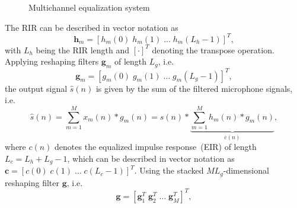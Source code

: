 \documentclass{article}
\begin{document}
\begin{figure}[b]
  \caption{Multichannel equalization system}
  \label{fig: acsys}
\end{figure}
The RIR can be described in vector notation as 
\begin{equation}
\mathbf{h}_m = [h_m(0) \; h_m(1) \; \ldots \; h_m(L_h-1)]^T,
\end{equation} 
with $L_h$ being the RIR length and $[\cdot]^T$ denoting the transpose operation.
Applying reshaping filters $\mathbf{g}_m$ of length $L_g$, i.e. 
\begin{equation}
\mathbf{g}_m = [g_m(0) \; g_m(1) \; \ldots \; g_m(L_g-1)]^T,
\end{equation}
the output signal $\hat{s}(n)$ is given by the sum of the filtered microphone signals, i.e.
\begin{equation}
  \hat{s}(n)  = \sum_{m=1}^M x_m(n) \ast g_m(n) =  s(n) \ast \underbrace{\sum_{m=1}^M h_m(n) \ast g_m(n)}_{c(n)},
\end{equation}
where $c(n)$ denotes the equalized impulse response~(EIR) of length $L_c = L_h+L_g-1$, which can be described in vector notation as $\mathbf{c} = [c(0) \; c(1) \; \ldots \; c(L_c-1)]^T$.
Using the stacked $ML_g$-dimensional reshaping filter $\mathbf{g}$, i.e.
\begin{equation}
  \mathbf{g} = [\mathbf{g}_1^T \; \mathbf{g}_2^T \; \ldots \; \mathbf{g}_M^T]^T,
\end{equation}
\end{document}
